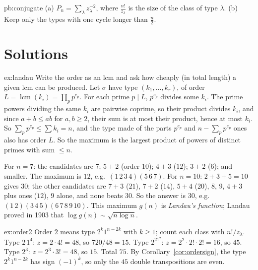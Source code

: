 \begin{hint}{pb:conjugate}
(a) $P_n=\sum_\lambda z_\lambda^{-2}$, where $\frac{n!}{z_\lambda}$ is the size of the class of type $\lambda$. (b) Keep only the
types with one cycle longer than $\frac n2$.
\end{hint}

\section{Solutions}

\begin{solution}{ex:landau}
\idea Write the order as an lcm and ask how cheaply (in total length) a given lcm can be produced.
\writeup Let $\sigma$ have type $(k_1,\dots,k_r)$, of order $L=\operatorname{lcm}(k_i)=\prod_pp^{e_p}$. For each prime $p\mid L$, $p^{e_p}$ divides some $k_i$. The prime powers dividing the same $k_i$ are pairwise coprime, so their product divides $k_i$, and since $a+b\le ab$ for $a,b\ge2$, their sum is at most their product, hence at most $k_i$. So $\sum_pp^{e_p}\le\sum k_i=n$, and the type made of the parts $p^{e_p}$ and $n-\sum_pp^{e_p}$ ones also has order $L$. So the maximum is the largest product of powers of distinct primes with sum $\le n$.

For $n=7$: the candidates are $7$; $5+2$ (order $10$); $4+3$ ($12$); $3+2$ ($6$); and smaller. The maximum is $12$, e.g.\ $(1\,2\,3\,4)(5\,6\,7)$. For $n=10$: $2+3+5=10$ gives $30$; the other candidates are $7+3$ ($21$), $7+2$ ($14$), $5+4$ ($20$), $8$, $9$, $4+3$ plus ones ($12$), $9$ alone, and none beats $30$. So the answer is $30$, e.g.\ $(1\,2)(3\,4\,5)(6\,7\,8\,9\,10)$. This maximum $g(n)$ is \emph{Landau's function}; Landau proved in 1903 that $\log g(n)\sim\sqrt{n\log n}$.
\end{solution}

\begin{solution}{ex:order2}
\idea Order $2$ means type $2^k1^{n-2k}$ with $k\ge1$; count each class with $n!/z_\lambda$.
\writeup Type $2\,1^4$: $z=2\cdot4!=48$, so $720/48=15$. Type $2^21^2$: $z=2^2\cdot2!\cdot2!=16$, so $45$. Type $2^3$: $z=2^3\cdot3!=48$, so $15$. Total $75$. By Corollary~\ref{cor:ordersign}, the type $2^k1^{n-2k}$ has sign $(-1)^k$, so only the $45$ double transpositions are even.
\end{solution}

